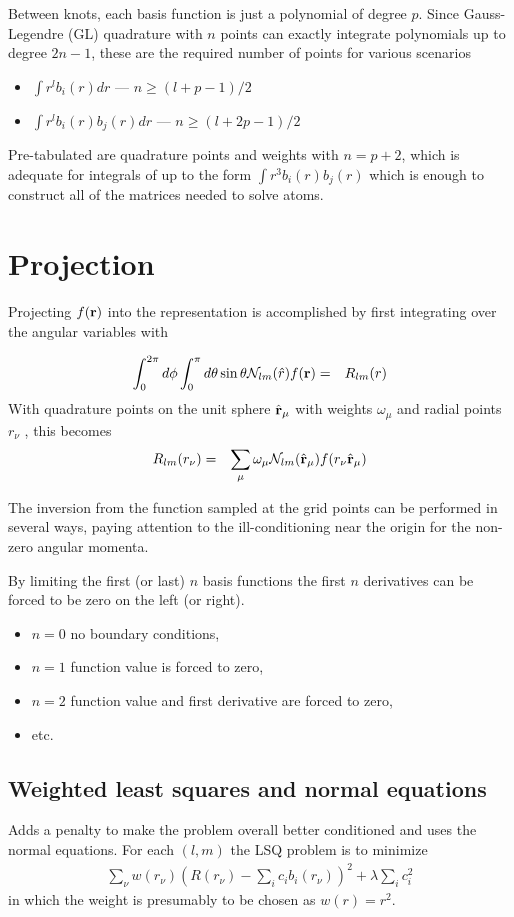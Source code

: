 \documentclass[12pt]{article}
\newcommand{\N}{\mathcal{N}}
\newcommand{\rv}{\vb{r}}
\newcommand{\rhat}{\hat{\rv}}
\begin{document}
Between knots, each basis function is just a polynomial of degree $p$.  Since Gauss-Legendre (GL) quadrature with $n$ points can exactly integrate polynomials up to degree $2n-1$, these are the required number of points for various scenarios
\begin{itemize}
\item $\int r^l b_i(r) dr$ --- $n \ge (l+p-1)/2$
\item $\int r^l b_i(r) b_j(r) dr$ --- $n \ge (l+2p-1)/2$
\end{itemize}
Pre-tabulated are quadrature points and weights with $n=p+2$, which is adequate for integrals of up to the form $\int r^3 b_i(r) b_j(r)$ which is enough to construct all of the matrices needed to solve atoms.

\section{Projection}

Projecting $f(\vb{r})$ into the representation is accomplished by first integrating over the angular variables with

\begin{eqnarray}
  \int_0^{2 \pi} d\phi \int_0^\pi d\theta \sin \theta  \N_{lm} (\hat{r}) f(\vb{r}) & = & R_{lm}(r) 
\end{eqnarray}
With quadrature points on the unit sphere $\rhat_\mu$ with
weights $\omega_\mu$ and radial points $r_\nu$ , this becomes
\begin{eqnarray}
  R_{lm}(r_\nu) & = & \sum_\mu \omega_\mu \N_{lm} (\rhat_\mu) f(r_\nu \rhat_\mu)
\end{eqnarray}

The inversion from the function sampled at the grid points can be performed in several ways, paying attention to the ill-conditioning near the origin for the non-zero angular momenta.

By limiting the first (or last) $n$ basis functions the first $n$ derivatives can be forced to be zero on the left (or right).  
\begin{itemize}
\item $n=0$ no boundary conditions,
\item $n=1$ function value is forced to zero,
\item $n=2$ function value and first derivative are forced to zero,
\item etc.
\end{itemize}

\subsection{Weighted least squares and normal equations}
Adds a penalty to make the problem overall better conditioned and uses the normal equations.  For each $(l,m)$ the LSQ problem is to minimize
\begin{eqnarray}
  \sum_\nu  w(r_\nu) \left( R(r_\nu) - \sum_i c_i b_i(r_\nu) \right)^2 + \lambda \sum_i c_i^2
\end{eqnarray}
in which the weight is presumably to be chosen as $w(r)=r^2$.
\end{document}
